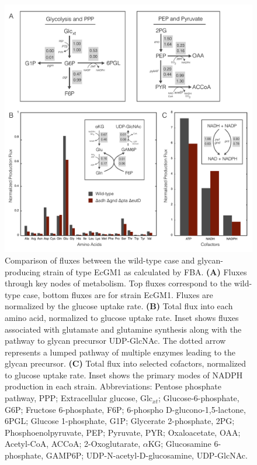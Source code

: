 \documentclass[12pt]{article}
\begin{document}
\begin{figure}\centering
\includegraphics[width=\textwidth]{./figures/fig3-flux-compare.pdf}
\caption{Comparison of fluxes between the wild-type case and glycan-producing strain of type EcGM1 as calculated by FBA. \textbf{(A)} Fluxes through key nodes of metabolism. Top fluxes correspond to the wild-type case, bottom fluxes are for strain EcGM1. Fluxes are normalized by the glucose uptake rate. \textbf{(B)} Total flux into each amino acid, normalized to glucose uptake rate. Inset shows fluxes associated with glutamate and glutamine synthesis along with the pathway to glycan precursor UDP-GlcNAc. The dotted arrow represents a lumped pathway of multiple enzymes leading to the glycan precursor. \textbf{(C)} Total flux into selected cofactors, normalized to glucose uptake rate. Inset shows the primary modes of NADPH production in each strain. Abbreviations: Pentose phosphate pathway, PPP; Extracellular glucose, Glc$_{xt}$; Glucose-6-phosphate, G6P; Fructose 6-phosphate, F6P; 6-phospho D-glucono-1,5-lactone, 6PGL; Glucose 1-phosphate, G1P; Glycerate 2-phosphate, 2PG; Phosphoenolpyruvate, PEP; Pyruvate, PYR; Oxaloacetate, OAA; Acetyl-CoA, ACCoA; 2-Oxoglutarate, $\alpha$KG; Glucosamine 6-phosphate, GAMP6P; UDP-N-acetyl-D-glucosamine, UDP-GlcNAc.
}
\label{fig-KO-flux-analysis}
\end{figure}
\end{document}

